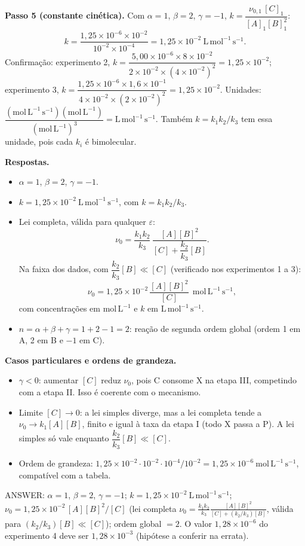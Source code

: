 \documentclass{article}%
\begin{document}
\textbf{Passo 5 (constante cinética).} Com $\alpha=1$, $\beta=2$, $\gamma=-1$, $k=\dfrac{\nu_{0,1}\,[C]_1}{[A]_1[B]_1^{2}}$:
\[ k=\frac{1{,}25\times10^{-6}\times10^{-2}}{10^{-2}\times10^{-4}}=1{,}25\times10^{-2}\ \mathrm{L\,mol^{-1}\,s^{-1}}. \]
Confirmação: experimento 2, $k=\dfrac{5{,}00\times10^{-6}\times8\times10^{-2}}{2\times10^{-2}\times(4\times10^{-2})^{2}}=1{,}25\times10^{-2}$; experimento 3, $k=\dfrac{1{,}25\times10^{-6}\times1{,}6\times10^{-1}}{4\times10^{-2}\times(2\times10^{-2})^{2}}=1{,}25\times10^{-2}$. Unidades: $\dfrac{(\mathrm{mol\,L^{-1}\,s^{-1}})(\mathrm{mol\,L^{-1}})}{(\mathrm{mol\,L^{-1}})^{3}}=\mathrm{L\,mol^{-1}\,s^{-1}}$. Também $k=k_1k_2/k_3$ tem essa unidade, pois cada $k_i$ é bimolecular.

\textbf{Respostas.}
\begin{itemize}
\item[a)] $\alpha=1$, $\beta=2$, $\gamma=-1$.
\item[b)] $k=1{,}25\times10^{-2}\ \mathrm{L\,mol^{-1}\,s^{-1}}$, com $k=k_1k_2/k_3$.
\item[c)] Lei completa, válida para qualquer $\varepsilon$:
\[ \nu_0=\frac{k_1k_2}{k_3}\,\frac{[A][B]^2}{[C]+\dfrac{k_2}{k_3}[B]}. \]
Na faixa dos dados, com $\dfrac{k_2}{k_3}[B]\ll[C]$ (verificado nos experimentos 1 a 3):
\[ \nu_0=1{,}25\times10^{-2}\,\frac{[A][B]^2}{[C]}\ \ \mathrm{mol\,L^{-1}\,s^{-1}}, \]
com concentrações em $\mathrm{mol\,L^{-1}}$ e $k$ em $\mathrm{L\,mol^{-1}\,s^{-1}}$.
\item[d)] $n=\alpha+\beta+\gamma=1+2-1=2$: reação de segunda ordem global (ordem 1 em A, 2 em B e $-1$ em C).
\end{itemize}

\textbf{Casos particulares e ordens de grandeza.}
\begin{itemize}
\item $\gamma<0$: aumentar $[C]$ reduz $\nu_0$, pois C consome X na etapa III, competindo com a etapa II. Isso é coerente com o mecanismo.
\item Limite $[C]\to0$: a lei simples diverge, mas a lei completa tende a $\nu_0\to k_1[A][B]$, finito e igual à taxa da etapa I (todo X passa a P). A lei simples só vale enquanto $\dfrac{k_2}{k_3}[B]\ll[C]$.
\item Ordem de grandeza: $1{,}25\times10^{-2}\cdot10^{-2}\cdot10^{-4}/10^{-2}=1{,}25\times10^{-6}\ \mathrm{mol\,L^{-1}\,s^{-1}}$, compatível com a tabela.
\end{itemize}

ANSWER: $\alpha=1$, $\beta=2$, $\gamma=-1$; $k=1{,}25\times10^{-2}\ \mathrm{L\,mol^{-1}\,s^{-1}}$; $\nu_0=1{,}25\times10^{-2}\,[A][B]^2/[C]$ (lei completa $\nu_0=\frac{k_1k_2}{k_3}\frac{[A][B]^2}{[C]+(k_2/k_3)[B]}$, válida para $(k_2/k_3)[B]\ll[C]$); ordem global $=2$. O valor $1{,}28\times10^{-6}$ do experimento 4 deve ser $1{,}28\times10^{-3}$ (hipótese a conferir na errata).%
\newpage%
\end{document}
